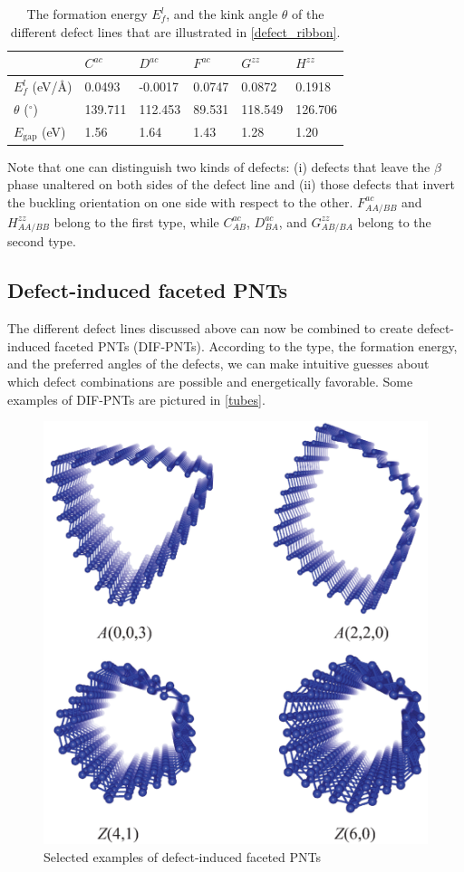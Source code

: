 \begin{table}[htb] 
\centering
\caption{The formation energy $E_f^l$, and the kink angle $\theta$ of the different defect lines that are illustrated in \autoref{defect_ribbon}. \label{tab-DL}}
\begin{tabularx}{0.8\linewidth}{l|XXXXX}   
\hline \hline
                      & $C^{ac}$ & $D^{ac}$ & $F^{ac}$  & $G^{zz}$ & $H^{zz}$\\
\hline
$E_f^l$	(eV/\AA)        &	 0.0493  & -0.0017  & 0.0747 &  0.0872  &  0.1918 \\ 
$\theta$ ($^{\circ}$) &   139.711   &  112.453 & 89.531 & 118.549  & 126.706 \\
$E_{\text{gap}}$ (eV) & 1.56  & 1.64 & 1.43 & 1.28 & 1.20 \\
\hline \hline
\end{tabularx}
\end{table}


Note that one can distinguish two kinds of defects: (i) defects that leave the $\beta$ phase unaltered on both sides of the defect line and (ii) those defects that invert the buckling orientation on one side with respect to the other. $F_{AA/BB}^{ac}$ and $H_{AA/BB}^{zz}$ belong to the first type, while $C_{AB}^{ac}$, $D_{BA}^{ac}$, and $G_{AB/BA}^{zz}$ belong to the second type. 

\subsection{Defect-induced faceted PNTs}
The different defect lines discussed above can now be combined to create defect-induced faceted PNTs (DIF-PNTs).
According to the type, the formation energy, and the preferred angles of the defects, we can make intuitive guesses about which defect combinations are possible and energetically favorable. Some examples of DIF-PNTs are pictured in \autoref{tubes}. 

\begin{figure}[htbp]
\centering
\includegraphics[width=0.7\linewidth]{Nanotu_tubes.eps}%
\caption{Selected examples of defect-induced faceted PNTs \label{tubes}}
\end{figure}

